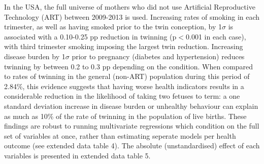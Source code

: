 \documentclass{nature}
\begin{document}
\begin{linenumbers}
In the USA, the full universe of mothers who did not use Artificial Reproductive Technology (ART) between 2009-2013 is used.  Increasing rates of smoking in each trimester, as well as having smoked prior to the twin conception, by 1$\sigma$ is associated with a 0.10-0.25 pp reduction in twinning (p$<$0.001 in each case), with third trimester smoking imposing the largest twin reduction.  Increasing disease burden by 1$\sigma$ prior to pregnancy (diabetes and hypertension) reduces twinning by between 0.2 to 0.3 pp depending on the condition. When compared to rates of twinning in the general (non-ART) population during this period of 2.84\%, this evidence suggests that having worse health indicators results in a considerable reduction in the likelihood of taking two fetuses to term: a one standard deviation increase in disease burden or unhealthy behaviour can explain as much as 10\% of the rate of twinning in the population of live births.  These findings are robust to running multivariate regressions which condition on the full set of variables at once, rather than estimating seperate models per health outcome (see extended data table 4).  The absolute (unstandardised) effect of each variables is presented in extended data table 5.


\end{linenumbers}
\end{document}
